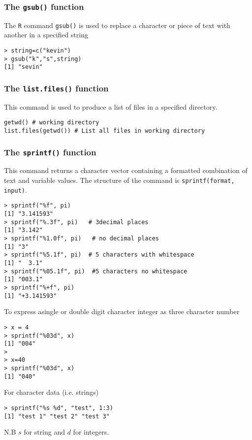 \documentclass[12pt]{article}
\begin{document}
\subsubsection{The \texttt{gsub()} function}
The \texttt{R} command \texttt{gsub()} is used to replace a character or piece of text with another in a specified string
\begin{verbatim}
> string=c("kevin")
> gsub("k","s",string)
[1] "sevin"
\end{verbatim}
\newpage
\subsubsection{The \texttt{list.files()} function}
This command is used to produce a list of files in a specified directory.
\begin{framed}
\begin{verbatim}
getwd() # working directory
list.files(getwd()) # List all files in working directory
\end{verbatim}
\end{framed}
\subsubsection{The \texttt{sprintf()} function}
This command returns a character vector containing a formatted combination of text and variable values. The structure of the command is \texttt{sprintf(format, input)}.
\begin{verbatim}
> sprintf("%f", pi)     
[1] "3.141593"
> sprintf("%.3f", pi)   # 3decimal places
[1] "3.142"
> sprintf("%1.0f", pi)   # no decimal places
[1] "3"
> sprintf("%5.1f", pi)  # 5 characters with whitespace
[1] "  3.1"  
> sprintf("%05.1f", pi)  #5 characters no whitespace
[1] "003.1"
> sprintf("%+f", pi)
[1] "+3.141593"
\end{verbatim}

To express asingle or double digit character integer as three character number
\begin{verbatim}
> x = 4
> sprintf("%03d", x)
[1] "004"
> 
> x=40
> sprintf("%03d", x)
[1] "040"
\end{verbatim}

For character data (i.e. strings) 
\begin{verbatim}
> sprintf("%s %d", "test", 1:3)
[1] "test 1" "test 2" "test 3"
\end{verbatim}
N.B $s$ for string and $d$ for integers.
\newpage
\end{document}
